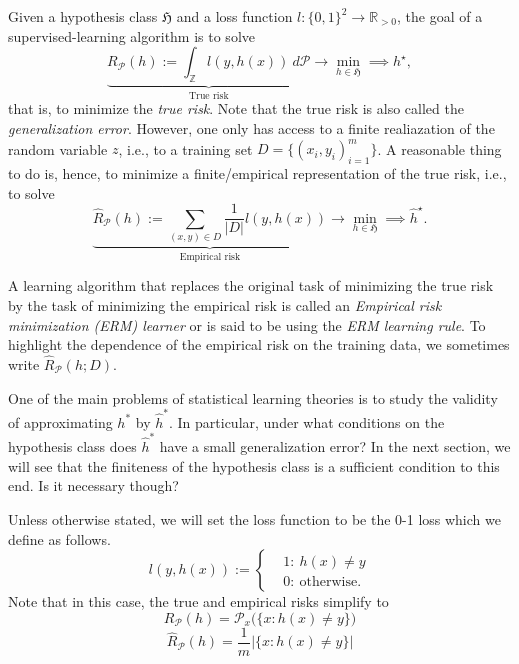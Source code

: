 Given a hypothesis class $\mathfrak{H}$  and a loss function $l:\{0,1\}^2 \to \mathbb{R}_{>0}$, the goal of a supervised-learning
algorithm is to solve 
\begin{equation*}
    \underbrace{R_{\mathcal{P}}(h) := \int_{\mathbb{Z}} l(y, h(x)) \ d \mathcal{P}}_{\text{True risk}} \longrightarrow \min_{h \in \mathfrak{H}} \implies h^\star, 
\end{equation*}
that is, to minimize the \emph{true risk}. Note that the true risk is also called the
\emph{generalization error}. However, one only has access to a finite
realiazation of the random variable $z$, i.e., to a training set $D=\{(x_i,
y_i)_{i=1}^m\}$. A reasonable thing to do is, hence, to minimize a
finite/empirical representation of the true risk, i.e., to solve
\begin{equation*}
    \underbrace{\hat{R}_{\mathcal{P}} (h) := \sum_{(x,y) \in D} \frac{1}{|D|}l(y, h(x)) }_{\text{Empirical risk}} \longrightarrow \min_{h \in \mathfrak{H}} \implies \hat{h}^\star.
\end{equation*}

A learning algorithm that replaces the original task of minimizing the true risk
by the task of minimizing the empirical risk is called an \emph{Empirical risk
minimization (ERM) learner} or
is said to be using the \emph{ERM learning rule}. To highlight the dependence of
the empirical risk on the training data, we sometimes write $\hat{R}_{\mathcal{P}}(h;D)$.

One of the main problems of statistical learning theories is to study the
validity of approximating $h^*$ by $\hat{h}^*$. In particular, under what
conditions on the hypothesis class does $\hat{h}^*$ have a small generalization error?
In the next section, we will see that the finiteness of the hypothesis class is
a sufficient condition to this end. Is it necessary though?

Unless otherwise stated, we will set the loss function to be the 0-1 loss which we define as follows.
\begin{equation*}
    l(y, h(x)) :=
    \begin{cases}
         & 1: \ h(x) \neq y \\
        & 0: \ \text{otherwise}.
    \end{cases}	
\end{equation*}
Note that in this case, the true and empirical risks simplify to
$$
R_{\mathcal{P}}(h) = \mathcal{P}_x \bigl(\{x: h(x) \neq y\} \bigr)
$$
$$
\hat{R}_{\mathcal{P}}(h) = \frac{1}{m} | \{x: h(x) \neq y\} |
$$

